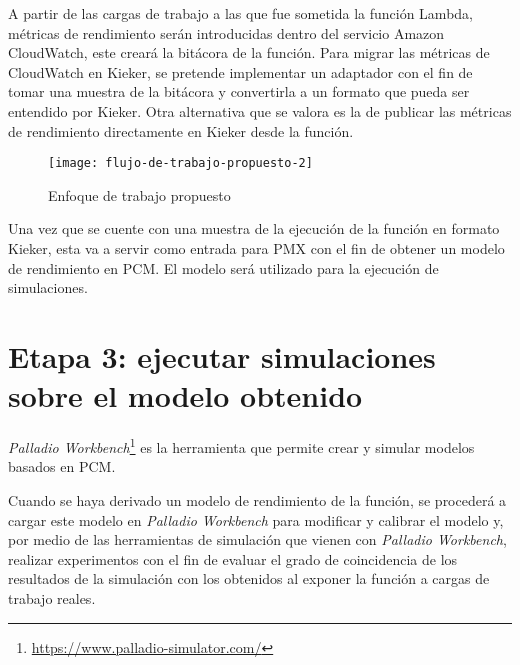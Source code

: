 A partir de las cargas de trabajo a las que fue sometida la función Lambda, métricas de rendimiento serán introducidas dentro del servicio Amazon CloudWatch, este creará la bitácora de la función. Para migrar las métricas de CloudWatch en Kieker, se pretende implementar un adaptador con el fin de tomar una muestra de la bitácora y convertirla a un formato que pueda ser entendido por Kieker. Otra alternativa que se valora es la de publicar las métricas de rendimiento directamente en Kieker  desde la función. 

\begin{figure}[h]
  \centering
  \texttt{[image: flujo-de-trabajo-propuesto-2]}
  \caption{Enfoque de trabajo propuesto}
  \label{fig:flujo-de-trabajo-propuesto}
\end{figure}

Una vez que se cuente con una muestra de la ejecución de la función en formato Kieker, esta va a servir como entrada para PMX con el fin de obtener un modelo de rendimiento en PCM. El modelo será utilizado para la ejecución de simulaciones.

\section{Etapa 3: ejecutar simulaciones sobre el modelo obtenido}
\emph{Palladio Workbench}\footnote{\url{https://www.palladio-simulator.com/}} es la herramienta que permite crear y simular modelos basados en PCM. 

Cuando se haya derivado un modelo de rendimiento de la función, se procederá a cargar este modelo en \emph{Palladio Workbench} para modificar y calibrar el modelo y, por medio de las herramientas de simulación que vienen con \emph{Palladio Workbench}, realizar experimentos con el fin de evaluar el grado de coincidencia de los resultados de la simulación con los obtenidos al exponer la función a cargas de trabajo reales.